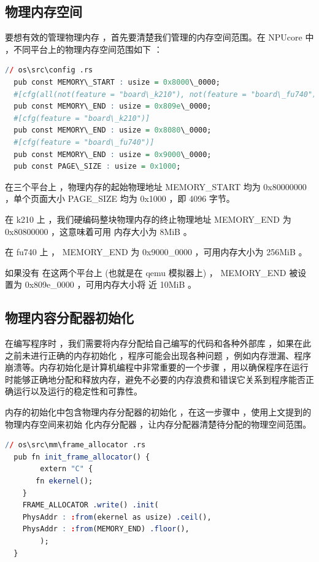 \documentclass[12pt, a4paper]{ctexart}
\begin{document}
	
	\subsection{物理内存空间}
	
	要想有效的管理物理内存 ，首先要清楚我们管理的内存空间范围。在 NPUcore 中 ，不同平台上的物理内存空间范围如下 ：
	
	\begin{lstlisting}[language=R]
  // os\src\config .rs
  pub const MEMORY\_START : usize = 0x8000\_0000;
  #[cfg(all(not(feature = "board\_k210"), not(feature = "board\_fu740")))]
  pub const MEMORY\_END : usize = 0x809e\_0000;
  #[cfg(feature = "board\_k210")]
  pub const MEMORY\_END : usize = 0x8080\_0000;
  #[cfg(feature = "board\_fu740")]
  pub const MEMORY\_END : usize = 0x9000\_0000;
  pub const PAGE\_SIZE : usize = 0x1000;
    \end{lstlisting}

	在三个平台上 ，物理内存的起始物理地址 MEMORY\_START 均为  0x80000000 ，单个页面大小 PAGE\_SIZE 均为 0x1000 ，即 4096 字节。
	
	在 k210 上 ，我们硬编码整块物理内存的终止物理地址 MEMORY\_END 为 0x80800000 ，这意味着可用 内存大小为  8MiB 。
	
	在 fu740 上 ，   MEMORY\_END 为  0x9000\_0000 ，可用内存大小为 256MiB 。
	
	如果没有 在这两个平台上  (也就是在 qemu 模拟器上)  ，   MEMORY\_END 被设置为  0x809e\_0000 ，可用内存大小将  近 10MiB 。	
	\subsection{物理内容分配器初始化}
	
	在编写程序时 ，我们需要将内存分配给自己编写的代码和各种外部库 ，如果在此之前未进行正确的内存初始化 ，程序可能会出现各种问题 ，例如内存泄漏、程序崩溃等。内存初始化是计算机编程中非常重要的一个步骤 ，用以确保程序在运行时能够正确地分配和释放内存，避免不必要的内存浪费和错误它关系到程序能否正确运行以及运行的稳定性和可靠性。
	
	内存的初始化中包含物理内存分配器的初始化 ，在这一步骤中 ，使用上文提到的物理内存空间来初始 化内存分配器 ，让内存分配器清楚待分配的物理空间范围。
	
	\begin{lstlisting}[language=R]
  // os\src\mm\frame_allocator .rs
  pub fn init_frame_allocator() {
    	extern "C" {
	   fn ekernel();
    }
    FRAME_ALLOCATOR .write() .init(
    PhysAddr : :from(ekernel as usize) .ceil(),
    PhysAddr : :from(MEMORY_END) .floor(),
    	);
  }
	\end{lstlisting}
	
\end{document}
